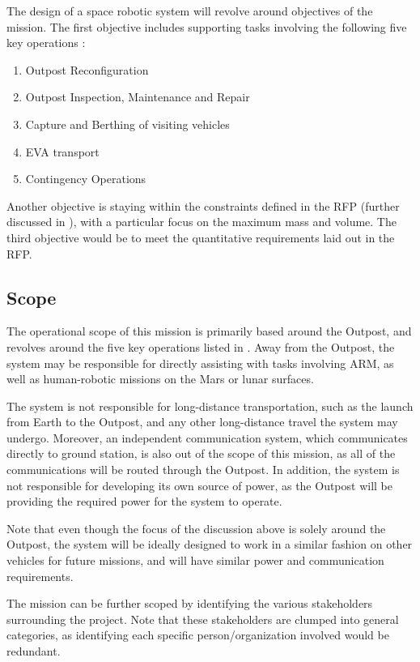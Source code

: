 \documentclass[12pt, letter]{article}
\begin{document}
The design of a space robotic system will revolve around objectives of the mission. The first objective includes supporting tasks involving the following five key operations\cite{RFP} :
\begin{enumerate}
\item{Outpost Reconfiguration}
\item{Outpost Inspection, Maintenance and Repair}
\item{Capture and Berthing of visiting vehicles}
\item{EVA transport}
\item{Contingency Operations}
\end{enumerate}

Another objective is staying within the constraints defined in the RFP (further discussed in ), with a particular focus on the maximum mass and volume. The third objective would be to meet the quantitative requirements laid out in the RFP.\cite{RFP} 
\newpage
\subsection{Scope}
\label{scope}
The operational scope of this mission is primarily based around the Outpost, and revolves around the five key operations listed in . Away from the Outpost, the system may be responsible for directly assisting with tasks involving ARM, as well as human-robotic missions on the Mars or lunar surfaces. 

The system is not responsible for long-distance transportation, such as the launch from Earth to the Outpost, and any other long-distance travel the system may undergo. Moreover, an independent communication system, which communicates directly to ground station, is also out of the scope of this mission, as all of the communications will be routed through the Outpost. In addition, the system is not responsible for developing its own source of power, as the Outpost will be providing the required power for the system to operate.

Note that even though the focus of the discussion above is solely around the Outpost, the system will be ideally designed to work in a similar fashion on other vehicles for future missions, and will have similar power and communication requirements.

The mission can be further scoped by identifying the various stakeholders surrounding the project. Note that these stakeholders are clumped into general categories, as identifying each specific person/organization involved would be redundant.
\end{document}
